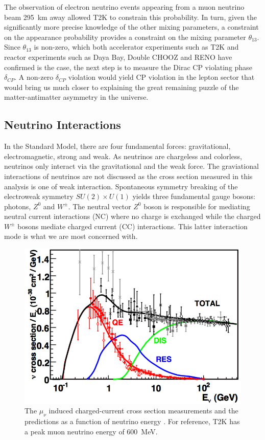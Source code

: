 The observation of electron neutrino events appearing from a muon neutrino beam 295~km away allowed T2K to constrain this probability. In turn, given the significantly more precise knowledge of the other mixing parameters, a constraint on the appearance probability provides a constraint on the mixing parameter $\theta_{13}$. Since $\theta_{13}$ is non-zero, which both accelerator experiments such as T2K and reactor experiments such as Daya Bay, Double CHOOZ and RENO have confirmed is the case, the next step is to measure the Dirac CP violating phase $\delta_{CP}$. A non-zero $\delta_{CP}$ violation would yield CP violation in the lepton sector that would bring us much closer to explaining the great remaining puzzle of the matter-antimatter asymmetry in the universe.


\subsection{Neutrino Interactions}
\label{sec:neutint}

In the Standard Model, there are four fundamental forces: gravitational, electromagnetic, strong and weak. As neutrinos are chargeless and colorless, neutrinos only interact via the gravitational and the weak force. The graviational interactions of neutrinos are not discussed as the cross section measured in this analysis is one of weak interaction. Spontaneous symmetry breaking of the electroweak symmetry $SU(2) \times U(1)$ yields three fundamental gauge bosons: photons, $Z^0$ and $W^{\pm}$. The neutral vector $Z^0$ boson is responsible for mediating neutral current interactions (NC) where no charge is exchanged while the charged $W^{\pm}$ bosons mediate charged current (CC) interactions. This latter interaction mode is what we are most concerned with. 

\begin{figure}
\centering
\includegraphics[width=6in]{Figures/neutrino-xsec.png}
\caption{The $\mu_\nu$ induced charged-current cross section measurements and the predictions as a function of neutrino energy \cite{Hewett:2012ns}. For reference, T2K has a peak muon neutrino energy of 600~MeV.} 
\label{fig:CCxsec}
\end{figure}

